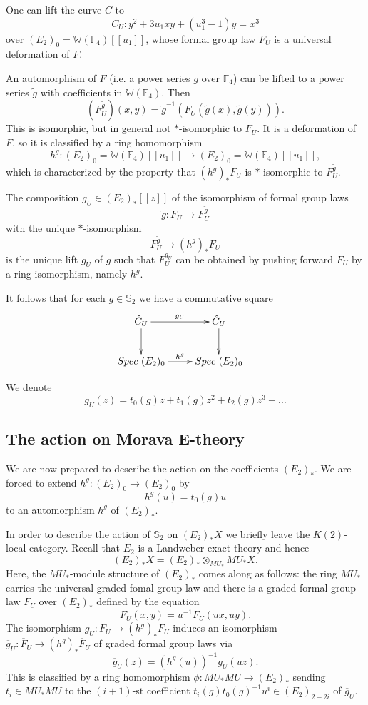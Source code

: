\documentclass{amsart}
\renewcommand{\S}{{\mathbb S}}
\newcommand {\F}{{\mathbb F}}
\newcommand {\W}{{\mathbb W}}
\numberwithin{equation}{section}
\theoremstyle{definition}  %
\newtheorem{set theory}[thm]{Set Theoretic Prelude}
\begin{document}
One can lift the curve $C$ to $$C_U:y^2+3u_1xy+(u_1^3-1)y=x^3$$ over $(E_2)_0=\W(\F_4)[[u_1]]$,
whose formal group law $F_U$ is a universal deformation of $F$. 

An automorphism of $F$ (i.e. a power series $g$ over $\F_4$) can be lifted to a power series $\tilde{g}$
with coefficients in $\W(\F_4)$. Then $$(F_U^{\tilde{g}})(x,y) = \tilde{g}^{-1}(F_U(\tilde{g}(x),\tilde{g}(y))).$$
This is isomorphic, but in general not $*$-isomorphic to $F_U$. It is a deformation of $F$,
so it is classified by a ring homomorphism 
$$h^g: (E_2)_0=\W(\F_4)[[u_1]]\to (E_2)_0=\W(\F_4)[[u_1]],$$
which is characterized by the property that $(h^g)_*F_U$ is $*$-isomorphic to $F_U^{\tilde{g}}$.




The composition $g_U\in (E_2)_*[[z]]$ of the isomorphism of formal group laws $$\tilde{g}:F_U \to F_U^{\tilde{g}}$$ with
the unique $*$-isomorphism $$F_U^{\tilde{g}} \to (h^g)_*F_U$$ is the unique lift $g_U$ of $g$ such that $F_U^{g_U}$ 
can be obtained by pushing forward $F_U$ by a ring isomorphism, namely $h^g$. 

It follows that for each $g\in \S_2$ we have a commutative square
\begin{eqnarray*}\label{}
&\xymatrix{
\hat{C}_U \ar[d]\ar[r]^-{g_U}
&
\hat{C}_U\ar[d]
\\
Spec\ (E_2)_0
\ar[r]^{h^g}
&
Spec\ (E_2)_0
}
\end{eqnarray*} 

We denote $$g_U(z)=t_0(g)z+t_1(g)z^2+t_2(g)z^3+\dots$$


\subsection{The action on Morava E-theory}
We are now prepared to describe the action on the coefficients $(E_2)_*$. We are forced to extend $h^g:(E_2)_0\to (E_2)_0$ by
$$
h^g (u) = t_0(g)u
$$
to an automorphism $h^g$ of $(E_2)_*$.

In order to describe the action 
of $\S_2$ on $(E_2)_*X$ we briefly leave the $K(2)$-local category. Recall that $E_2$ is a Landweber exact theory and hence
$$(E_2)_*X = (E_2)_*\otimes_{MU_*} MU_*X.$$ 
Here, the $MU_*$-module structure of $(E_2)_*$ comes along as follows: the ring $MU_*$ carries the universal graded fomal group law and there is  a graded formal group law $\overline{F}_U$ over $(E_2)_*$ defined by the equation
$$\overline{F}_U(x,y)=u^{-1}F_U(ux,uy).$$
The isomorphism $g_U:F_U \to (h^g)_*F_U$ induces an isomorphism $\overline{g}_U:\overline{F}_U \to (h^g)_*\overline{F}_U$ of 
graded formal group laws via
$$\overline{g}_U(z)=(h^g(u))^{-1}g_U(uz).$$ 
This
is classified by a ring homomorphism $\phi: MU_*MU\to (E_2)_*$ sending $t_i\in MU_*MU$ to the $(i+1)$-st coefficient
$t_i(g)t_0(g)^{-1}u^{i}\in (E_2)_{2-2i}$ of $\overline{g}_U$. %
\end{document}
